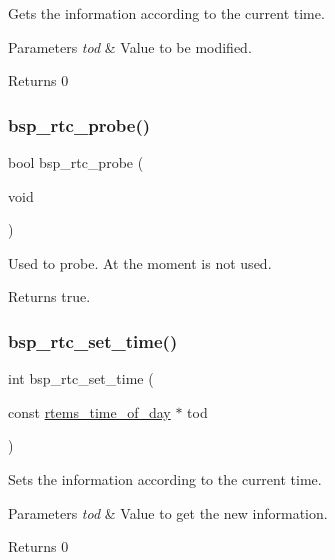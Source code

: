 Gets the information according to the current time. 


\begin{DoxyParams}{Parameters}
{\em tod} & Value to be modified. \\
\hline
\end{DoxyParams}
\begin{DoxyReturn}{Returns}
0 
\end{DoxyReturn}
\mbox{\label{arm_2lpc176x_2rtc_2rtc-config_8c_ab3b17932563f0f719652ad72fbfe5ad9}} 
\subsubsection{\texorpdfstring{bsp\_rtc\_probe()}{bsp\_rtc\_probe()}}
{\footnotesize\ttfamily bool bsp\+\_\+rtc\+\_\+probe (\begin{DoxyParamCaption}\item[{void}]{ }\end{DoxyParamCaption})}



Used to probe. At the moment is not used. 

\begin{DoxyReturn}{Returns}
true. 
\end{DoxyReturn}
\mbox{\label{arm_2lpc176x_2rtc_2rtc-config_8c_afd88bd5c47a2878aa8bb815078cb38ae}} 
\subsubsection{\texorpdfstring{bsp\_rtc\_set\_time()}{bsp\_rtc\_set\_time()}}
{\footnotesize\ttfamily int bsp\+\_\+rtc\+\_\+set\+\_\+time (\begin{DoxyParamCaption}\item[{const \mbox{\hyperlink{structrtems__time__of__day}{rtems\+\_\+time\+\_\+of\+\_\+day}} $\ast$}]{tod }\end{DoxyParamCaption})}



Sets the information according to the current time. 


\begin{DoxyParams}{Parameters}
{\em tod} & Value to get the new information. \\
\hline
\end{DoxyParams}
\begin{DoxyReturn}{Returns}
0 
\end{DoxyReturn}


